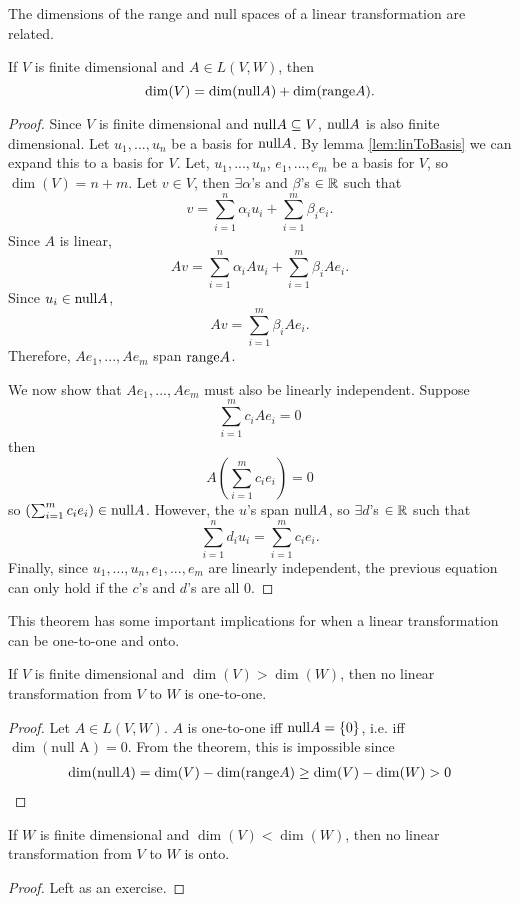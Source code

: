 The dimensions of the range and null spaces of
a linear transformation are related.
\begin{theorem}
  If $V$ is finite dimensional and $A \in L(V,W)$, then 
  \[ \mathrm{dim}(V) = \mathrm{dim}(\mathrm{null} A) + \mathrm{dim}(\mathrm{range} A). \]
\end{theorem}
\begin{proof}
  Since $V$ is finite dimensional and $\mathrm{null} A \subseteq V$,
  $\mathrm{null} A$ is also finite dimensional. Let $u_1, ..., u_n$ be
  a basis for $\mathrm{null} A$. By lemma \ref{lem:linToBasis} we can
  expand this to a basis for $V$. Let, $u_1, ...,
  u_n$, $e_1, ..., e_m$ be a basis for $V$, so $\dim(V) = n + m$. 
  Let $v \in V$, then $\exists \alpha$'s and $\beta$'s $\in \mathbb{R}$ such
  that 
  \[ v = \sum_{i=1}^n \alpha_i u_i  + \sum_{i=1}^m \beta_i e_i. \]
  Since $A$ is linear, 
  \[ A v = \sum_{i=1}^n \alpha_i A u_i  + \sum_{i=1}^m \beta_i A
  e_i. \]
  Since $u_i \in \mathrm{null} A$, 
  \[ A v =  \sum_{i=1}^m \beta_i A
  e_i. \]
  Therefore, $A e_1, ..., A e_m$ span $\mathrm{range} A$. 
  
  We now show that $A e_1, ..., A e_m$ must also be linearly
  independent. Suppose
  \[ \sum_{i=1}^m c_i A e_i = 0 \]
  then 
  \[ A \left( \sum_{i=1}^m c_i e_i \right) = 0\]
  so $\left( \sum_{i=1}^m c_i e_i \right) \in \mathrm{null}
  A$. However, the $u$'s span $ \mathrm{null} A$, so $\exists d$'s $\in
  \mathbb{R}$ such that
  \[ \sum_{i=1}^n d_i u_i = \sum_{i=1}^m c_i e_i. \]
  Finally, since $u_1, ..., u_n, e_1, ..., e_m$ are linearly
  independent, the previous equation can only hold if the $c$'s and
  $d$'s are all $0$. 
\end{proof}
This theorem has some important implications for when a linear
transformation can be one-to-one and onto. 
\begin{corollary}
  If $V$ is finite dimensional and $\dim(V) > \dim(W)$, then no linear
  transformation from $V$ to $W$ is one-to-one.
\end{corollary}
\begin{proof}
  Let $A \in L(V,W)$. $A$ is one-to-one iff $\mathrm{null} A = \{0\}$,
  i.e. iff $\dim(\text{null A}) = 0$. From the theorem, this is
  impossible since
  \begin{align*}
    \mathrm{dim}(\mathrm{null} A) = \mathrm{dim}(V) - \mathrm{dim}(\mathrm{range} A) \geq
    \mathrm{dim}(V) - \mathrm{dim}(W) > 0 
  \end{align*}
\end{proof}
\begin{corollary}
  If $W$ is finite dimensional and $\dim(V) < \dim(W)$, then no linear
  transformation from $V$ to $W$ is onto.
\end{corollary}
\begin{proof}
  Left as an exercise. 
\end{proof}

